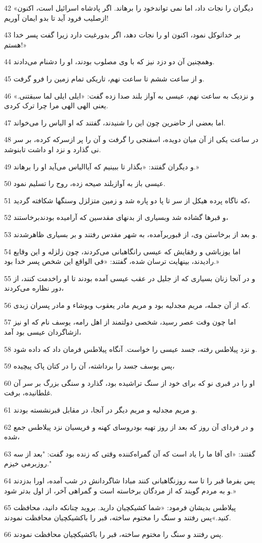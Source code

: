 \par 42 «دیگران را نجات داد، اما نمی تواندخود را برهاند. اگر پادشاه اسرائیل است، اکنون ازصلیب فرود آید تا بدو ایمان آوریم!
\par 43 بر خداتوکل نمود، اکنون او را نجات دهد، اگر بدورغبت دارد زیرا گفت پسر خدا هستم!»
\par 44 وهمچنین آن دو دزد نیز که با وی مصلوب بودند، او را دشنام می‌دادند.
\par 45 و از ساعت ششم تا ساعت نهم، تاریکی تمام زمین را فرو گرفت.
\par 46 و نزدیک به ساعت نهم، عیسی به آواز بلند صدا زده گفت: «ایلی ایلی لما سبقتنی.» یعنی الهی الهی مرا چرا ترک کردی.
\par 47 اما بعضی از حاضرین چون این را شنیدند، گفتند که او الیاس را می‌خواند.
\par 48 در ساعت یکی از آن میان دویده، اسفنجی را گرفت و آن را پر ازسرکه کرده، بر سر نی گذارد و نزد او داشت تابنوشد.
\par 49 و دیگران گفتند: «بگذار تا ببینیم که آیاالیاس می‌آید او را برهاند.»
\par 50 عیسی باز به آوازبلند صیحه زده، روح را تسلیم نمود.
\par 51 که ناگاه پرده هیکل از سر تا پا دو پاره شد و زمین متزلزل وسنگها شکافته گردید،
\par 52 و قبرها گشاده شد وبسیاری از بدنهای مقدسین که آرامیده بودندبرخاستند،
\par 53 و بعد از برخاستن وی، از قبوربرآمده، به شهر مقدس رفتند و بر بسیاری ظاهرشدند.
\par 54 اما یوزباشی و رفقایش که عیسی رانگاهبانی می‌کردند، چون زلزله و این وقایع رادیدند، بینهایت ترسان شده، گفتند: «فی الواقع این شخص پسر خدا بود.»
\par 55 و در آنجا زنان بسیاری که از جلیل در عقب عیسی آمده بودند تا او راخدمت کنند، از دور نظاره می‌کردند،
\par 56 که از آن جمله، مریم مجدلیه بود و مریم مادر یعقوب ویوشاء و مادر پسران زبدی.
\par 57 اما چون وقت عصر رسید، شخصی دولتمند از اهل رامه، یوسف نام که او نیز ازشاگردان عیسی بود آمد،
\par 58 و نزد پیلاطس رفته، جسد عیسی را خواست. آنگاه پیلاطس فرمان داد که داده شود.
\par 59 پس یوسف جسد را برداشته، آن را در کتان پاک پیچیده،
\par 60 او را در قبری نو که برای خود از سنگ تراشیده بود، گذارد و سنگی بزرگ بر سر آن غلطانیده، برفت.
\par 61 و مریم مجدلیه و مریم دیگر در آنجا، در مقابل قبرنشسته بودند.
\par 62 و در فردای آن روز که بعد از روز تهیه بودروسای کهنه و فریسیان نزد پیلاطس جمع شده،
\par 63 گفتند: «ای آقا ما را یاد است که آن گمراه‌کننده وقتی که زنده بود گفت: "بعد از سه روزبرمی خیزم."
\par 64 پس بفرما قبر را تا سه روزنگاهبانی کنند مبادا شاگردانش در شب آمده، اورا بدزدند و به مردم گویند که از مردگان برخاسته است و گمراهی آخر، از اول بدتر شود.»
\par 65 پیلاطس بدیشان فرمود: «شما کشیکچیان دارید. بروید چنانکه دانید، محافظت کنید.»پس رفتند و سنگ را مختوم ساخته، قبر را باکشیکچیان محافظت نمودند.
\par 66 پس رفتند و سنگ را مختوم ساخته، قبر را باکشیکچیان محافظت نمودند.

